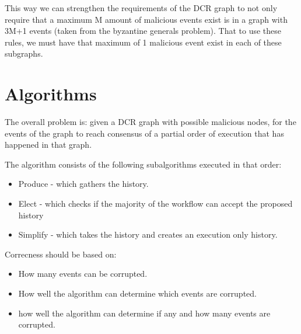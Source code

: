 This way we can strengthen the requirements of the DCR graph to not only require that a maximum M amount of malicious events exist is in a graph with 3M+1 events (taken from the byzantine generals problem). That to use these rules, we must have that maximum of 1 malicious event exist in each of these subgraphs.

\chapter{Algorithms}
The overall problem is: given a DCR graph with possible malicious nodes, for the events of the graph to reach consensus of a partial order of execution that has happened in that graph.

The algorithm consists of the following subalgorithms executed in that order:
\begin{itemize}
    \item Produce - which gathers the history.
    \item Elect - which checks if the majority of the workflow can accept the proposed history
    \item Simplify - which takes the history and creates an execution only history.
\end{itemize}

Correcness should be based on:
\begin{itemize}
    \item How many events can be corrupted.
    \item How well the algorithm can determine which events are corrupted.
    \item how well the algorithm can determine if any and how many events are corrupted.
\end{itemize}








